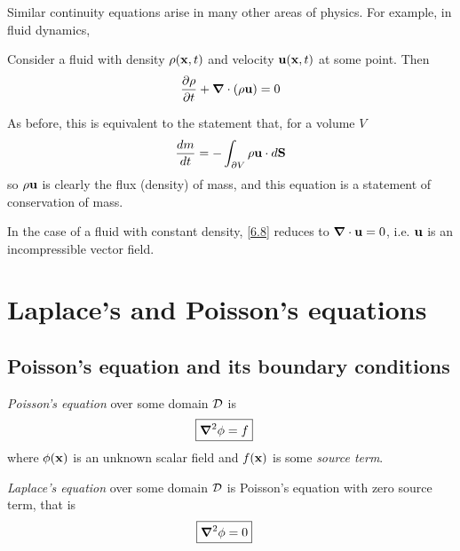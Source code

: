 \documentclass{../template/note}
\begin{document}
    Similar continuity equations arise in many other areas of physics. For example, in fluid dynamics,
    \begin{proposition}
        \label{6.8} Consider a fluid with density \(\rho(\V x, t)\) and velocity \(\V u(\V x, t)\) at some point. Then
        \begin{align*}
            \pd \rho t + \div (\rho \V u) = 0
        \end{align*}
    \end{proposition}
    As before, this is equivalent to the statement that, for a volume \(V\)
    \begin{align*}
        \frac{dm}{dt} = -\int_{\pr V} \rho \V u \cdot d\V S
    \end{align*}
    so \(\rho \V u\) is clearly the flux (density) of mass, and this equation is a statement of conservation of mass.

    In the case of a fluid with constant density, \cref{6.8} reduces to \(\div \V u = 0\), i.e. \(\V u\) is an incompressible vector field.

    \section{Laplace's and Poisson's equations}

    \subsection{Poisson's equation and its boundary conditions}

    \begin{definition*}
        \emph{Poisson's equation} over some domain \(\mathcal{D}\) is
        \begin{align*}
            \Aboxed{\grad^2 \phi = f}
        \end{align*}
        where \(\phi(\V x)\) is an unknown scalar field and \(f(\V x)\) is some \emph{source term}.
    \end{definition*}
    
    \begin{definition*}
        \emph{Laplace's equation} over some domain \(\mathcal{D}\) is Poisson's equation with zero source term, that is
        \begin{align*}
            \Aboxed{\grad^2 \phi = 0}
        \end{align*}
    \end{definition*}
    
\end{document}
